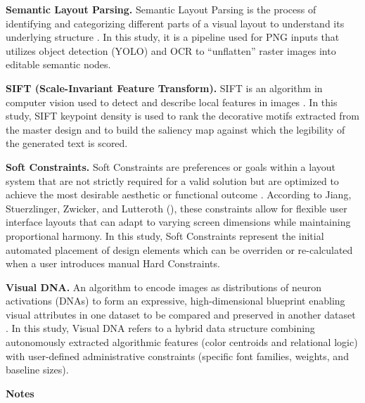 \begin{refsection}
    \textbf{Semantic Layout Parsing.} Semantic Layout Parsing is the process of identifying and categorizing different parts of a visual layout to understand its underlying structure \cite{BobLd2024}. In this study, it is a pipeline used for PNG inputs that utilizes object detection (YOLO) and OCR to “unflatten” raster images into editable semantic nodes.

    \textbf{SIFT (Scale-Invariant Feature Transform).} SIFT is an algorithm in computer vision used to detect and describe local features in images \cite{Lowe2009}. In this study, SIFT keypoint density is used to rank the decorative motifs extracted from the master design and to build the saliency map against which the legibility of the generated text is scored.

    \textbf{Soft Constraints.} Soft Constraints are preferences or goals within a layout system that are not strictly required for a valid solution but are optimized to achieve the most desirable aesthetic or functional outcome \cite{Jiang2020ORCSolver}. According to Jiang, Stuerzlinger, Zwicker, and Lutteroth (\citeyear{Jiang2020ORCSolver}), these constraints allow for flexible user interface layouts that can adapt to varying screen dimensions while maintaining proportional harmony. In this study, Soft Constraints represent the initial automated placement of design elements which can be overriden or re-calculated when a user introduces manual Hard Constraints.    

    \textbf{Visual DNA.} An algorithm to encode images as distributions of neuron activations (DNAs) to form an expressive, high-dimensional blueprint enabling visual attributes in one dataset to be compared and preserved in another dataset \cite{Matzetal2023}. In this study, Visual DNA refers to a hybrid data structure combining autonomously extracted algorithmic features (color centroids and relational logic) with user-defined administrative constraints (specific font families, weights, and baseline sizes).


\clearpage

\begin{center}
\textbf{Notes}
\end{center}
\printbibliography[heading=none]
\end{refsection}